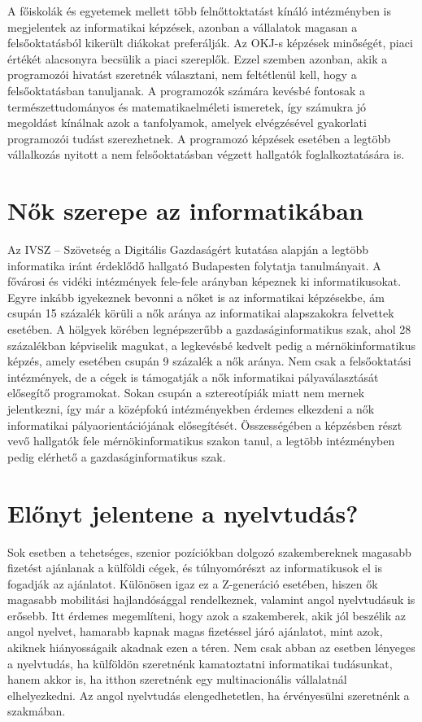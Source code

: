 \documentclass{thesis-ekf}
\begin{document}
A főiskolák és egyetemek mellett több felnőttoktatást kínáló intézményben is megjelentek az informatikai képzések, azonban a vállalatok magasan a felsőoktatásból kikerült diákokat preferálják. Az OKJ-s képzések minőségét, piaci értékét alacsonyra becsülik a piaci szereplők. Ezzel szemben azonban, akik a programozói hivatást szeretnék választani, nem feltétlenül kell, hogy a felsőoktatásban tanuljanak. A programozók számára kevésbé fontosak a természettudományos és matematikaelméleti ismeretek, így számukra jó megoldást kínálnak azok a tanfolyamok, amelyek elvégzésével gyakorlati programozói tudást szerezhetnek. A programozó képzések esetében a legtöbb vállalkozás nyitott a nem felsőoktatásban végzett hallgatók foglalkoztatására is.

\section{Nők szerepe az informatikában}
Az IVSZ – Szövetség a Digitális Gazdaságért kutatása alapján a legtöbb informatika iránt érdeklődő hallgató Budapesten folytatja tanulmányait. A fővárosi és vidéki intézmények fele-fele arányban képeznek ki informatikusokat. Egyre inkább igyekeznek bevonni a nőket is az informatikai képzésekbe, ám csupán 15 százalék körüli a nők aránya az informatikai alapszakokra felvettek esetében. A hölgyek körében legnépszerűbb a gazdaságinformatikus szak, ahol 28 százalékban képviselik magukat, a legkevésbé kedvelt pedig a mérnökinformatikus képzés, amely esetében csupán 9 százalék a nők aránya. Nem csak a felsőoktatási intézmények, de a cégek is támogatják a nők informatikai pályaválasztását elősegítő programokat. Sokan csupán a sztereotípiák miatt nem mernek jelentkezni, így már a középfokú intézményekben érdemes elkezdeni a nők informatikai pályaorientációjának elősegítését. Összességében a képzésben részt vevő hallgatók fele mérnökinformatikus szakon tanul, a legtöbb intézményben pedig elérhető a gazdaságinformatikus szak.

\section{Előnyt jelentene a nyelvtudás?}
Sok esetben a tehetséges, szenior pozíciókban dolgozó szakembereknek magasabb fizetést ajánlanak a külföldi cégek, és túlnyomórészt az informatikusok el is fogadják az ajánlatot. Különösen igaz ez a Z-generáció esetében, hiszen ők magasabb mobilitási hajlandósággal rendelkeznek, valamint angol nyelvtudásuk is erősebb. Itt érdemes megemlíteni, hogy azok a szakemberek, akik jól beszélik az angol nyelvet, hamarabb kapnak magas fizetéssel járó ajánlatot, mint azok, akiknek hiányosságaik akadnak ezen a téren. Nem csak abban az esetben lényeges a nyelvtudás, ha külföldön szeretnénk kamatoztatni informatikai tudásunkat, hanem akkor is, ha itthon szeretnénk egy multinacionális vállalatnál elhelyezkedni. Az angol nyelvtudás elengedhetetlen, ha érvényesülni szeretnénk a szakmában.
\end{document}
